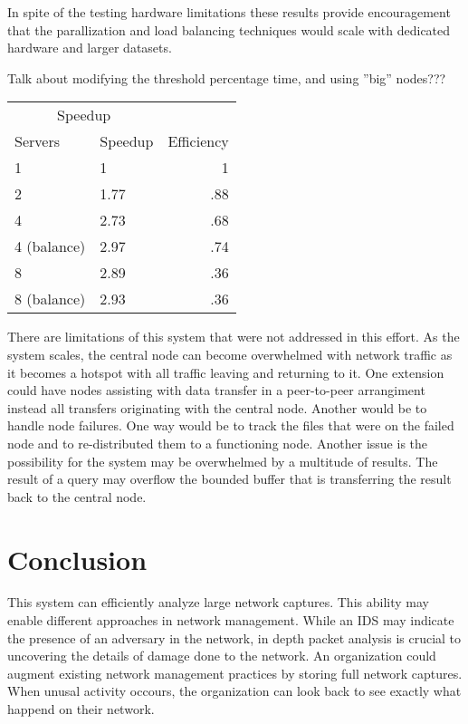 \documentclass{article}
\begin{document}
\begin{multicols}{2}
In spite of the testing hardware limitations these results provide encouragement that the parallization and load balancing techniques would scale with dedicated hardware and larger datasets.


Talk about modifying the threshold percentage time, and using ''big'' nodes???


\begin{tabular}{llr}
\hline
\multicolumn{2}{c}{Speedup} \\
\cline{1-2}
Servers    & Speedup & Efficiency  \\
\hline
1     &  1  & 1   \\
2     &   1.77  & .88  \\
4     &   2.73  & .68 \\
4 (balance) & 2.97 & .74     \\
8 &  2.89   & .36  \\
8 (balance) & 2.93 & .36      \\
\hline
\end{tabular}


There are limitations of this system that were not addressed in this effort.  As the system scales, the central node can become overwhelmed with network traffic as it becomes a hotspot with all traffic leaving and returning to it. One extension could have nodes assisting with data transfer in a peer-to-peer arrangiment instead all transfers originating with the central node.  Another would be to handle node failures. One way would be to track the files that were on the failed node and to re-distributed them to a functioning node.  Another issue is the possibility for the system may be overwhelmed by a multitude of results. The result of a query may overflow the bounded buffer that is transferring the result back to the central node.   


\section*{Conclusion}

This system can efficiently analyze large network captures. This ability may enable different approaches in network management.  While an IDS may indicate the presence of an adversary in the network, in depth packet analysis is crucial to uncovering the details of damage done to the network.  An organization could augment existing network management practices by storing full network captures.  When unusal activity occours, the organization can look back to see exactly what happend on their network.  

\end{multicols}
\end{document}
